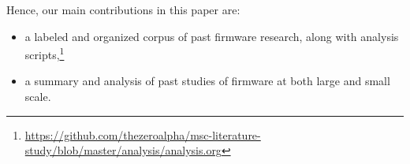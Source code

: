 \hfill

\noindent Hence, our main contributions in this paper are:

\begin{itemize}
  \item a labeled and organized corpus of past firmware research, along with analysis scripts,\footnote{\url{https://github.com/thezeroalpha/msc-literature-study/blob/master/analysis/analysis.org}}
  \item a summary and analysis of past studies of firmware at both large and small scale.
\end{itemize}
